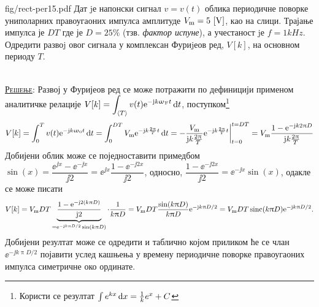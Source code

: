 \begin{slikaDesno}{fig/rect-per15.pdf}
    \PID\label{ID:rect_pulse_train_FS} 
    Дат jе напонски сигнал $v = v(t)$ облика периодичне поворке униполарних правоугаоних 
    импулса амплитуде ${V_{\rm m} = 5\,\left[\mathrm{V}\right]}$, као на слици. Трајање импулса је $DT$ где је 
$D = 25\%$ (тзв. \textit{фактор испуне}), а учестаност jе $f = 1\unit{kHz}$. 
Одредити развоj овог сигнала у комплексан Фуриjеов ред, $V[k]$, на основном периоду $T$.
\end{slikaDesno} \\

\textsc{\underline{Решење}}: Развој у Фуријеов ред се може потражити по дефиницији применом 
аналитичке релације 
$\displaystyle V[k] = \int_{\langle T \rangle} v(t) {\rm e}^{-{\rm j} k \upomega_{\rm F} t} \, {\rm d} t$, 
поступком\footnote{Користи се резултат $\int e^{kx} \, {\rm d} x = \frac{1}{k} e^x + C$}
\begin{align}
    V[k] = \int_{0}^T v(t) {\rm e}^{-{\rm j} k \upomega_{\rm 0} t} \, {\rm d} t 
         = \int_{0}^{DT}  V_{\rm m} {\rm e}^{-{\rm j} k \frac{2\uppi}{T} t} \, {\rm d} t
         = -\dfrac{V_{\rm m}}{{\rm j} k \frac{2\uppi}{T}} 
         {\rm e}^{-{\rm j} k \frac{2\uppi}{T} t}\bigg|_{t = 0}^{t = DT}
         = V_{\rm m}\dfrac{
            1
            -
            {\rm e}^{-{\rm j} k 2\uppi D}
         }{{\rm j} k \frac{2\uppi}{T}} 
\end{align}
Добијени облик може се поједноставити примедбом 
$\sin(x) = \dfrac{\ee^{\jj x} - \ee^{-\jj x}}{\jj 2} = \ee^{\jj x} \dfrac{1 - \ee^{-\jj 2x}}{\jj 2}$,
односно, 
$\dfrac{1 - \ee^{-\jj 2x}}{\jj 2} = \ee^{-\jj x} \sin(x) $,
одакле се може писати
\begin{align}
    V[k] = V_{\rm m}DT 
     \underbrace{
     \dfrac{
        1
        -
        {\rm e}^{-{\rm j} 2 (k \uppi D) }
     }{{\rm j} 2 }}_{ = {\rm e}^{-{\rm j} k \uppi D/2} \sin(k\uppi D) }
     \cdot 
     \dfrac{1}{k \uppi D} 
     = V_{\rm m} D T \dfrac{\sin(k\uppi D)}{k\uppi D} {\rm e}^{-{\rm j} k \uppi D/2} 
     = V_{\rm m} D T \operatorname{sinc}(k \uppi D) {\rm e}^{-{\rm j} k \uppi D/2}.
\end{align}
Добијени резултат може се одредити и таблично којом приликом ће се члан 
$\ee^{-\jj k \uppi D/2}$ појавити услед кашњења у времену периодичне поворке правоугаоних 
импулса симетричне око ординате. 
